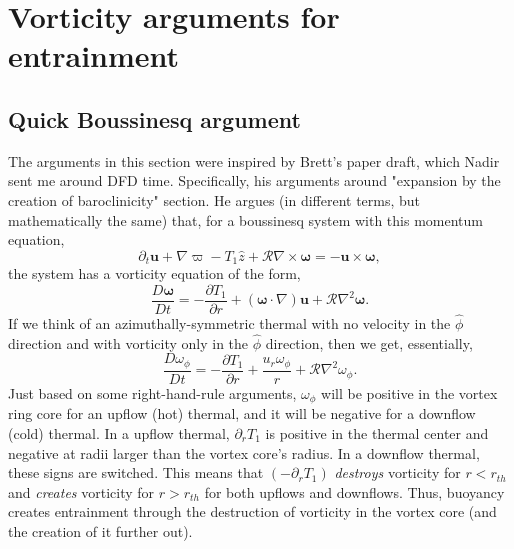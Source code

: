 \documentclass[onecolumn, amsmath, amsfonts, amssymb]{aastex62}
\newcommand{\grad}{\ensuremath{\nabla}}
\begin{document}
\section{Vorticity arguments for entrainment}
\subsection{Quick Boussinesq argument}
The arguments in this section were inspired by Brett's paper draft, which Nadir sent me
around DFD time. Specifically, his arguments around "expansion by the creation of baroclinicity"
section.  He argues (in different terms, but mathematically the same)
that, for a boussinesq system with this momentum equation,
$$
\partial_t \bm{u}  + \grad\varpi - T_1 \hat{z} + \mathcal{R}\grad\times\bm{\omega} = -\bm{u}\times\bm{\omega},
$$
the system has a vorticity equation of the form,
\begin{equation}
\frac{D\bm{\omega}}{Dt} = -\frac{\partial T_1}{\partial r} + (\bm{\omega}\cdot\grad)\bm{u} + \mathcal{R}\grad^2\bm{\omega}.
\end{equation}
If we think of an azimuthally-symmetric thermal with no velocity in the $\hat{\phi}$ direction
and with vorticity only in the $\hat{\phi}$ direction, then we get, essentially,
\begin{equation}
\frac{D\omega_\phi}{Dt} = -\frac{\partial T_1}{\partial r} + \frac{u_r \omega_\phi}{r} + \mathcal{R}\grad^2\omega_\phi.
\end{equation}
Just based on some right-hand-rule arguments, $\omega_\phi$ will be positive in the vortex ring
core for an upflow (hot) thermal, and it will be negative for a downflow (cold) thermal.
In a upflow thermal, $\partial_r T_1$ is positive in the thermal center and negative at radii
larger than the vortex core's radius. In a downflow thermal, these signs are switched. This means
that $(-\partial_r T_1)$ \emph{destroys} vorticity for $r < r_{th}$ and \emph{creates} vorticity
for $r > r_{th}$ for both upflows and downflows. Thus, buoyancy creates entrainment through
the destruction of vorticity in the vortex core (and the creation of it further out).
\end{document}
